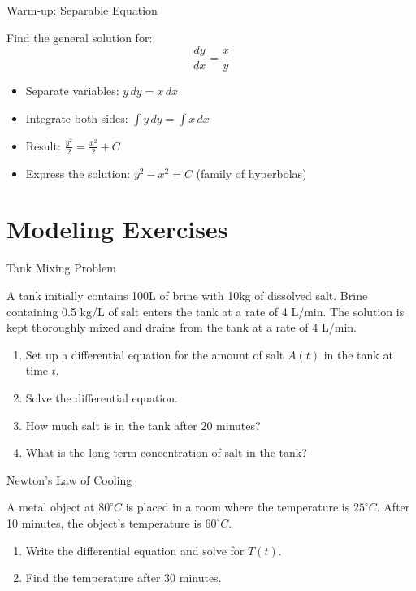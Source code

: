 \documentclass[10pt,aspectratio=169]{beamer}
\newcommand{\formula}[1]{\textit{#1}}
\begin{document}
\begin{frame}{Warm-up: Separable Equation}
    \begin{problembox}
        Find the general solution for:
        \formula{\[ \frac{dy}{dx} = \frac{x}{y} \]}
    \end{problembox}
    
    \begin{solutionbox}
        \begin{itemize}
            \item Separate variables: $y \, dy = x \, dx$
            \item Integrate both sides: $\int y \, dy = \int x \, dx$
            \item Result: $\frac{y^2}{2} = \frac{x^2}{2} + C$
            \item Express the solution: $y^2 - x^2 = C$ (family of hyperbolas)
        \end{itemize}
    \end{solutionbox}
\end{frame}

\section{Modeling Exercises}
\begin{frame}{Tank Mixing Problem}
    \begin{problembox}
        A tank initially contains 100L of brine with 10kg of dissolved salt. Brine containing 0.5 kg/L of salt enters the tank at a rate of 4 L/min. The solution is kept thoroughly mixed and drains from the tank at a rate of 4 L/min.
        \begin{enumerate}
            \item Set up a differential equation for the amount of salt $A(t)$ in the tank at time $t$.
            \item Solve the differential equation.
            \item How much salt is in the tank after 20 minutes?
            \item What is the long-term concentration of salt in the tank?
        \end{enumerate}
    \end{problembox}
\end{frame}

\begin{frame}{Newton's Law of Cooling}
    \begin{problembox}
        A metal object at $80^\circ C$ is placed in a room where the temperature is $25^\circ C$. After 10 minutes, the object's temperature is $60^\circ C$.
        \begin{enumerate}
            \item Write the differential equation and solve for $T(t)$.
            \item Find the temperature after 30 minutes.
        \end{enumerate}
    \end{problembox}
\end{frame}
\end{document}
